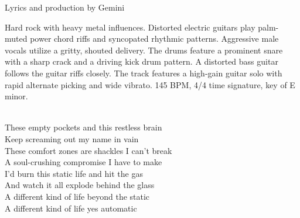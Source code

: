 
\label{sec:burn-the-glass}

\begin{notes}
Lyrics and production by Gemini
\end{notes}

\begin{style}
Hard rock with heavy metal influences. %
Distorted electric guitars play palm-muted power chord riffs and syncopated rhythmic patterns. %
Aggressive male vocals utilize a gritty, shouted delivery. %
The drums feature a prominent snare with a sharp crack and a driving kick drum pattern. %
A distorted bass guitar follows the guitar riffs closely. %
The track features a high-gain guitar solo with rapid alternate picking and wide vibrato. %
145 BPM, 4/4 time signature, key of E minor.
\end{style}

\begin{lyrics}


\\
These empty pockets and this restless brain\\
Keep screaming out my name in vain\\
These comfort zones are shackles I can't break\\
A soul-crushing compromise I have to make\\
I'd burn this static life and hit the gas\\
And watch it all explode behind the glass\\
A different kind of life beyond the static\\
A different kind of life yes automatic

\\

\\

\end{lyrics}

